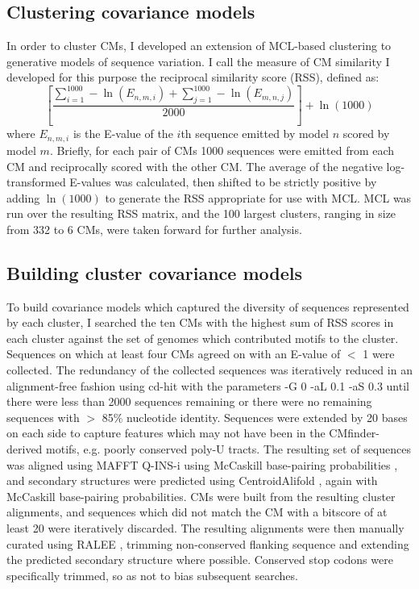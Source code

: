 \subsection{Clustering covariance models}

In order to cluster CMs, I developed an extension of MCL-based clustering \parencite{Enright2002} to generative models of sequence variation. I call the measure of CM similarity I developed for this purpose the reciprocal similarity score (RSS), defined as: \[ \left[\frac{\sum_{i=1}^{1000} -\ln{(E_{n,m,i})} +  \sum_{j=1}^{1000} -\ln{(E_{m,n,j})}}{2000}\right] + \ln(1000) \] where $E_{n,m,i}$ is the E-value of the $i$th sequence emitted by model $n$ scored by model $m$. Briefly, for each pair of CMs 1000 sequences were emitted from each CM and reciprocally scored with the other CM. The average of the negative log-transformed E-values was calculated, then shifted to be strictly positive by adding $\ln(1000)$ to generate the RSS appropriate for use with MCL. MCL was run over the resulting RSS matrix, and the 100 largest clusters, ranging in size from 332 to 6 CMs, were taken forward for further analysis.

\subsection{Building cluster covariance models}

To build covariance models which captured the diversity of sequences represented by each cluster, I searched the ten CMs with the highest sum of RSS scores in each cluster against the set of genomes which contributed motifs to the cluster. Sequences on which at least four CMs agreed on with an E-value of $<$ 1 were collected. The redundancy of the collected sequences was iteratively reduced in an alignment-free fashion using cd-hit \parencite{Li2006} with the parameters -G 0 -aL 0.1 -aS 0.3 until there were less than 2000 sequences remaining or there were no remaining sequences with $>$ 85\% nucleotide identity. Sequences were extended by 20 bases on each side to capture features which may not have been in the CMfinder-derived motifs, e.g. poorly conserved poly-U tracts. The resulting set of sequences was aligned using MAFFT Q-INS-i \parencite{Katoh2008} using McCaskill base-pairing probabilities \parencite{McCaskill1990}, and secondary structures were predicted using CentroidAlifold \parencite{Hamada2009}, again with McCaskill base-pairing probabilities. CMs were built from the resulting cluster alignments, and sequences which did not match the CM with a bitscore of at least 20 were iteratively discarded. The resulting alignments were then manually curated using RALEE \parencite{Griffiths-Jones2005}, trimming non-conserved flanking sequence and extending the predicted secondary structure where possible. Conserved stop codons were specifically trimmed, so as not to bias subsequent searches.

